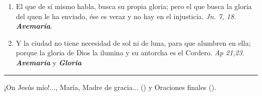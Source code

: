 \documentclass[./rosary.tex]{subfiles}
\begin{document}
\begin{enumerate}
    \item El que de sí mismo habla, busca su propia gloria; pero el que busca la gloria del quen le ha enviado, ése es veraz y no hay en el injusticia.
          \emph{Jn. 7, 18}. \textbf{\emph{Avemaría}}.

    \item Y la ciudad no tiene necesidad de sol ni de luna, para que alumbren en ella; porque la gloria de Dios la ilumina y su antorcha es el Cordero.
          \emph{Ap 21,23}. \textbf{\emph{Avemaría}} y \textbf{\emph{Gloria}}
\end{enumerate}

\rule{\textwidth}{0.5pt}

¡On Jesús mío!..., María, Madre de gracia... () y Oraciones finales ().
\end{document}
